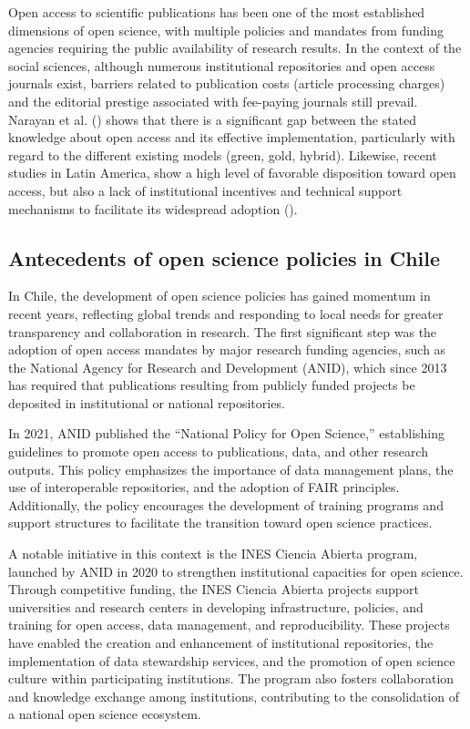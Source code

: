 \documentclass[
  english,
  letterpaper,
]{article}
\begin{document}
Open access to scientific publications has been one of the most
established dimensions of open science, with multiple policies and
mandates from funding agencies requiring the public availability of
research results. In the context of the social sciences, although
numerous institutional repositories and open access journals exist,
barriers related to publication costs (article processing charges) and
the editorial prestige associated with fee-paying journals still
prevail. Narayan et al. ()
shows that there is a significant gap between the stated knowledge about
open access and its effective implementation, particularly with regard
to the different existing models (green, gold, hybrid). Likewise, recent
studies in Latin America, show a high level of favorable disposition
toward open access, but also a lack of institutional incentives and
technical support mechanisms to facilitate its widespread adoption
().

\subsection{Antecedents of open science policies in
Chile}\label{antecedents-of-open-science-policies-in-chile}

In Chile, the development of open science policies has gained momentum
in recent years, reflecting global trends and responding to local needs
for greater transparency and collaboration in research. The first
significant step was the adoption of open access mandates by major
research funding agencies, such as the National Agency for Research and
Development (ANID), which since 2013 has required that publications
resulting from publicly funded projects be deposited in institutional or
national repositories.

In 2021, ANID published the ``National Policy for Open Science,''
establishing guidelines to promote open access to publications, data,
and other research outputs. This policy emphasizes the importance of
data management plans, the use of interoperable repositories, and the
adoption of FAIR principles. Additionally, the policy encourages the
development of training programs and support structures to facilitate
the transition toward open science practices.

A notable initiative in this context is the INES Ciencia Abierta
program, launched by ANID in 2020 to strengthen institutional capacities
for open science. Through competitive funding, the INES Ciencia Abierta
projects support universities and research centers in developing
infrastructure, policies, and training for open access, data management,
and reproducibility. These projects have enabled the creation and
enhancement of institutional repositories, the implementation of data
stewardship services, and the promotion of open science culture within
participating institutions. The program also fosters collaboration and
knowledge exchange among institutions, contributing to the consolidation
of a national open science ecosystem.
\end{document}
